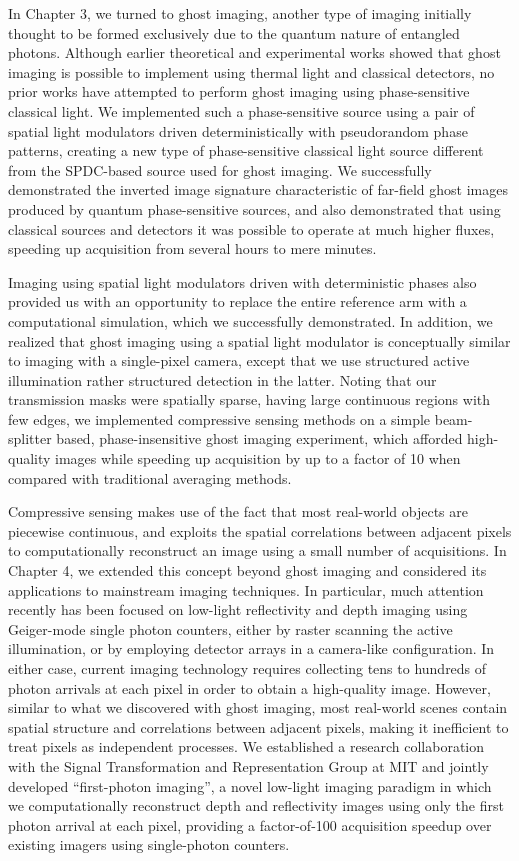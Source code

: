 In Chapter 3, we turned to ghost imaging, another type of imaging initially thought to be formed exclusively due to the quantum nature of entangled photons. Although earlier theoretical and experimental works showed that ghost imaging is possible to implement using thermal light and classical detectors, no prior works have attempted to perform ghost imaging using phase-sensitive classical light. We implemented such a phase-sensitive source using a pair of spatial light modulators driven deterministically with pseudorandom phase patterns, creating a new type of phase-sensitive classical light source different from the SPDC-based source used for ghost imaging. We successfully demonstrated the inverted image signature characteristic of far-field ghost images produced by quantum phase-sensitive sources, and also demonstrated that using classical sources and detectors it was possible to operate at much higher fluxes, speeding up acquisition from several hours to mere minutes.

Imaging using spatial light modulators driven with deterministic phases also provided us with an opportunity to replace the entire reference arm with a computational simulation, which we successfully demonstrated. In addition, we realized that ghost imaging using a spatial light modulator is conceptually similar to imaging with a single-pixel camera, except that we use structured active illumination rather structured detection in the latter. Noting that our transmission masks were spatially sparse, having large continuous regions with few edges, we implemented compressive sensing methods on a simple beam-splitter based, phase-insensitive ghost imaging experiment, which afforded high-quality images while speeding up acquisition by up to a factor of 10 when compared with traditional averaging methods.

Compressive sensing makes use of the fact that most real-world objects are piecewise continuous, and exploits the spatial correlations between adjacent pixels to computationally reconstruct an image using a small number of acquisitions. In Chapter 4, we extended this concept beyond ghost imaging and considered its applications to mainstream imaging techniques. In particular, much attention recently has been focused on low-light reflectivity and depth imaging using Geiger-mode single photon counters, either by raster scanning the active illumination, or by employing detector arrays in a camera-like configuration. In either case, current imaging technology requires collecting tens to hundreds of photon arrivals at each pixel in order to obtain a high-quality image. However, similar to what we discovered with ghost imaging, most real-world scenes contain spatial structure and correlations between adjacent pixels, making it inefficient to treat pixels as independent processes. We established a research collaboration with the Signal Transformation and Representation Group at MIT and jointly developed ``first-photon imaging'', a novel low-light imaging paradigm in which we computationally reconstruct depth and reflectivity images using only the first photon arrival at each pixel, providing a factor-of-100 acquisition speedup over existing imagers using single-photon counters.

